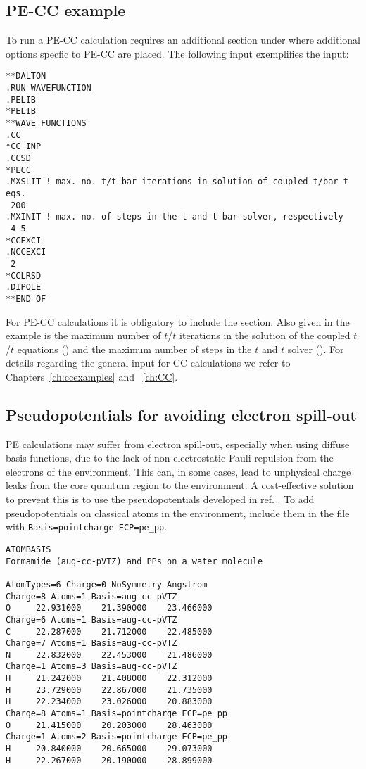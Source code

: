 \subsection*{PE-CC example}\label{subsec:pecc}
To run a PE-CC calculation requires an additional  section under
 where additional options specfic to PE-CC are placed.
The following input exemplifies the input:
\begin{verbatim}
**DALTON
.RUN WAVEFUNCTION
.PELIB
*PELIB
**WAVE FUNCTIONS
.CC
*CC INP
.CCSD
*PECC
.MXSLIT ! max. no. t/t-bar iterations in solution of coupled t/bar-t eqs.
 200
.MXINIT ! max. no. of steps in the t and t-bar solver, respectively
 4 5
*CCEXCI
.NCCEXCI
 2
*CCLRSD
.DIPOLE
**END OF
\end{verbatim}
For PE-CC calculations
it is obligatory to include the  section. Also given in the example
is the maximum number of $t$/$\bar{t}$ iterations in the solution of the
coupled $t$/$\bar{t}$ equations () and the maximum number of
steps in the $t$ and $\bar{t}$ solver (). For details regarding
the general input for CC calculations we refer to
Chapters~\ref{ch:ccexamples} and ~\ref{ch:CC}.

\subsection*{Pseudopotentials for avoiding electron spill-out}
PE calculations may suffer from electron spill-out, especially when using diffuse
basis functions, due to the lack of non-electrostatic Pauli repulsion from the electrons
of the environment. This can, in some cases, lead to unphysical charge leaks from
the core quantum region to the environment. 
A cost-effective solution to prevent this is to use the pseudopotentials developed
in ref. .
To add pseudopotentials on classical atoms in the environment, include them in the \molinp file with
\texttt{Basis=pointcharge ECP=pe\_pp}.

\begin{verbatim}
ATOMBASIS
Formamide (aug-cc-pVTZ) and PPs on a water molecule

AtomTypes=6 Charge=0 NoSymmetry Angstrom
Charge=8 Atoms=1 Basis=aug-cc-pVTZ
O     22.931000    21.390000    23.466000
Charge=6 Atoms=1 Basis=aug-cc-pVTZ
C     22.287000    21.712000    22.485000
Charge=7 Atoms=1 Basis=aug-cc-pVTZ
N     22.832000    22.453000    21.486000
Charge=1 Atoms=3 Basis=aug-cc-pVTZ
H     21.242000    21.408000    22.312000
H     23.729000    22.867000    21.735000
H     22.234000    23.026000    20.883000
Charge=8 Atoms=1 Basis=pointcharge ECP=pe_pp
O     21.415000    20.203000    28.463000
Charge=1 Atoms=2 Basis=pointcharge ECP=pe_pp
H     20.840000    20.665000    29.073000
H     22.267000    20.190000    28.899000
\end{verbatim}

